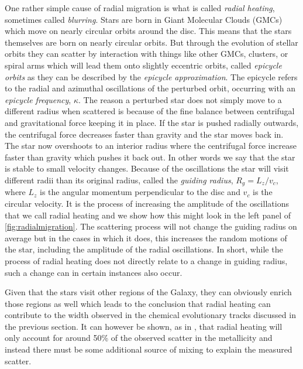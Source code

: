 One rather simple cause of radial migration is what is called \textit{radial heating}, sometimes called \textit{blurring}. Stars are born in Giant Molecular Clouds (GMCs) which move on nearly circular orbits around the disc. This means that the stars themselves are born on nearly circular orbits. But through the evolution of stellar orbits they can scatter by interaction with things like other GMCs, clusters, or spiral arms which will lead them onto slightly eccentric orbits, called \textit{epicycle orbits} as they can be described by the \textit{epicycle approximation}. The epicycle refers to the radial and azimuthal oscillations of the perturbed orbit, occurring with an \textit{epicycle frequency}, $\kappa$. The reason a perturbed star does not simply move to a different radius when scattered is because of the fine balance between centrifugal and gravitational force keeping it in place. If the star is pushed radially outwards, the centrifugal force decreases faster than gravity and the star moves back in. The star now overshoots to an interior radius where the centrifugal force increase faster than gravity which pushes it back out. In other words we say that the star is stable to small velocity changes. Because of the oscillations the star will visit different radii than its original radius, called the \textit{guiding radius}, $R_g = L_z / v_c$, where $L_z$ is the angular momentum perpendicular to the disc and $v_c$ is the circular velocity. It is the process of increasing the amplitude of the oscillations that we call radial heating and we show how this might look in the left panel of \ref{fig:radialmigration}. The scattering process will not change the guiding radius on average but in the cases in which it does, this increases the random motions of the star, including the amplitude of the radial oscillations. In short, while the process of radial heating does not directly relate to a change in guiding radius, such a change can in certain instances also occur. 

Given that the stars visit other regions of the Galaxy, they can obviously enrich those regions as well which leads to the conclusion that radial heating can contribute to the width observed in the chemical evolutionary tracks discussed in the previous section. It can however be shown, as in \cite{binney:07}, that radial heating will only account for around 50\% of the observed scatter in the metallicity and instead there must be some additional source of mixing to explain the measured scatter. 

